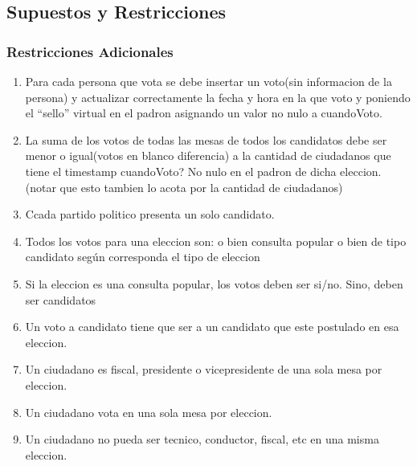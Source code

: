 \subsection{Supuestos y Restricciones}

\subsubsection{Restricciones Adicionales}

\begin{enumerate}
	\item  Para cada persona que vota se debe insertar un voto(sin informacion de la persona) y actualizar correctamente la fecha y hora en la que voto y poniendo el “sello” virtual en el padron asignando un valor no nulo a cuandoVoto.
	\item  La suma de los votos de todas las mesas de todos los candidatos debe ser menor o igual(votos en blanco diferencia) a la cantidad de ciudadanos que tiene el timestamp cuandoVoto? No nulo en el padron de dicha eleccion. (notar que esto tambien lo acota por la cantidad de ciudadanos)
	\item  Ccada partido politico presenta un solo candidato.
	\item  Todos los votos para una eleccion son: o bien consulta popular o bien de tipo candidato según corresponda el tipo de eleccion
	\item Si la eleccion es una consulta popular, los votos deben ser si/no. Sino, deben ser candidatos
	\item Un voto a candidato tiene que ser a un candidato que este postulado en esa eleccion.
	\item Un ciudadano es fiscal, presidente o vicepresidente de una sola mesa por eleccion.
	\item Un ciudadano vota en una sola mesa por eleccion.
	\item Un ciudadano no pueda ser tecnico, conductor, fiscal, etc en una misma eleccion.
\end{enumerate}
